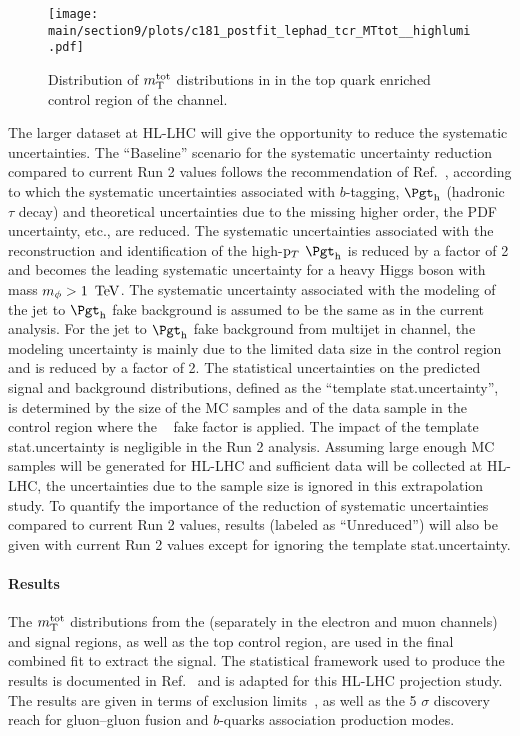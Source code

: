 \begin{figure}[!ht]
    \centering
        \qquad
        \texttt{[image: \\main/section9/plots/c181\_postfit\_lephad\_tcr\_MTtot\_\_highlumi.pdf]}
        \caption{Distribution of $m_\textnormal{T}^\textnormal{tot}$ distributions in in the top quark enriched control region of the \lephad channel.}
    \label{fig:mTtotDistributionsCR}
\end{figure}

The larger dataset at HL-LHC will give the opportunity to reduce the systematic uncertainties.
The ``Baseline'' scenario for the systematic uncertainty reduction compared to current Run 2 values follows
the recommendation of Ref.~\cite{LHATLASdetectorSystScale}, according to which the systematic uncertainties
associated with $b$-tagging, $\tauhad$ (hadronic $\tau$ decay) and theoretical uncertainties
due to the missing higher order,
the PDF uncertainty, etc., are reduced. The systematic uncertainties associated with the reconstruction
and identification of the high-$\mathrm{p}_{T}$ $\tauhad$ is reduced by a factor of 2 and becomes the leading systematic
uncertainty for a heavy Higgs boson with mass $m_{\phi} > 1~\,\text{Te\hspace{-.08em}V}$. The systematic uncertainty associated
with the modeling of the jet to $\tauhad$ fake background is assumed to be the same as in the current analysis.
For the jet to $\tauhad$ fake background from multijet in \hadhad channel, the modeling uncertainty is mainly
due to the limited data size in the control region and is reduced by a factor of 2. The statistical uncertainties
on the predicted signal and background distributions, defined as the ``template stat.\@ uncertainty'', is determined
by the size of the MC samples and of the data sample in the control region where the \tauhad~ fake factor is applied.
The impact of the template stat.\@ uncertainty is negligible in the Run 2 analysis. Assuming large enough MC
samples will be generated for HL-LHC and sufficient data will be collected at HL-LHC, the uncertainties due to
the sample size is ignored in this extrapolation study.
To quantify the importance of the reduction of systematic uncertainties compared to current Run 2 values,
results (labeled as ``Unreduced'') will also be given with current Run 2 values
except for ignoring the template stat.\@ uncertainty.

\paragraph{Results}
\label{sec:result}
The $m_\textnormal{T}^\textnormal{tot}$ distributions from the \lephad(separately in the electron and muon channels) and \hadhad signal regions, as well as the top control region, are used in the final combined fit to extract the signal. The statistical framework used to produce the \RunTwo results is documented in Ref.~\cite{ATLASRun2Ditau} and is adapted for this HL-LHC projection study. The results are given in terms of exclusion limits~\cite{CLs_2002}, as well as the 5 $\sigma$ discovery reach for gluon--gluon fusion and $b$-quarks association production modes.

